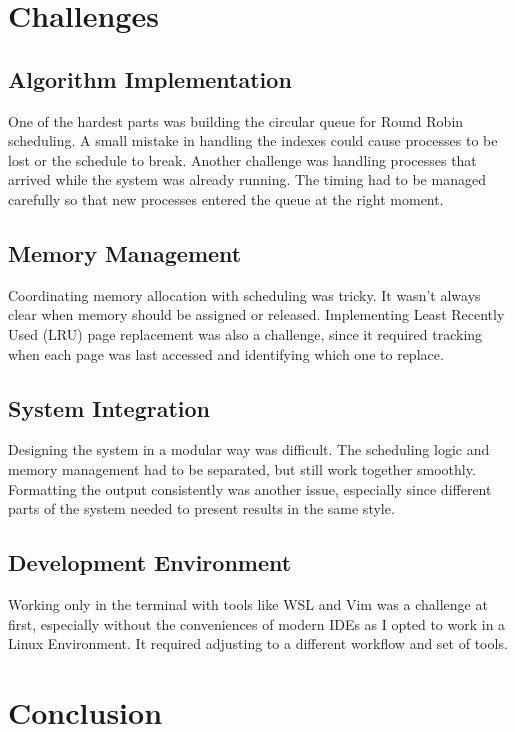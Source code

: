 \documentclass[12pt]{article}
\begin{document}
\section{Challenges}

\subsection{Algorithm Implementation}

One of the hardest parts was building the circular queue for Round Robin scheduling. A small mistake in handling the indexes could cause processes to be lost or the schedule to break.  
Another challenge was handling processes that arrived while the system was already running. The timing had to be managed carefully so that new processes entered the queue at the right moment.  

\subsection{Memory Management}

Coordinating memory allocation with scheduling was tricky. It wasn’t always clear when memory should be assigned or released.  
Implementing Least Recently Used (LRU) page replacement was also a challenge, since it required tracking when each page was last accessed and identifying which one to replace.  

\subsection{System Integration}

Designing the system in a modular way was difficult. The scheduling logic and memory management had to be separated, but still work together smoothly.  
Formatting the output consistently was another issue, especially since different parts of the system needed to present results in the same style.  

\subsection{Development Environment}

Working only in the terminal with tools like WSL and Vim was a challenge at first, especially without the conveniences of modern IDEs as I opted to work in a Linux Environment. It required adjusting to a different workflow and set of tools.


\section{Conclusion}
\end{document}
